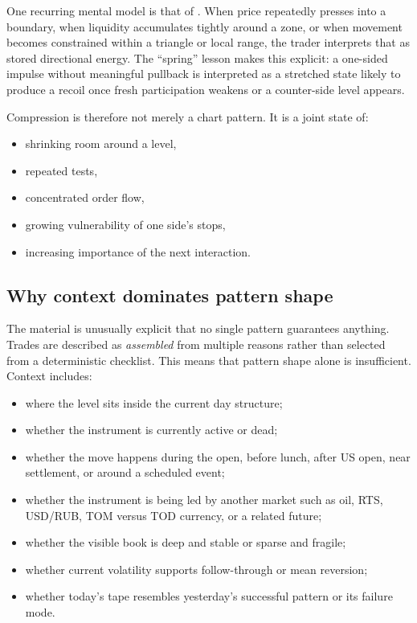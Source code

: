 One recurring mental model is that of . When price repeatedly presses into a boundary, when liquidity accumulates tightly around a zone, or when movement becomes constrained within a triangle or local range, the trader interprets that as stored directional energy. The ``spring'' lesson makes this explicit: a one-sided impulse without meaningful pullback is interpreted as a stretched state likely to produce a recoil once fresh participation weakens or a counter-side level appears.

Compression is therefore not merely a chart pattern. It is a joint state of:

\begin{itemize}[leftmargin=1.5em]
\item shrinking room around a level,
\item repeated tests,
\item concentrated order flow,
\item growing vulnerability of one side's stops,
\item increasing importance of the next interaction.
\end{itemize}

\subsection{Why context dominates pattern shape}

The material is unusually explicit that no single pattern guarantees anything. Trades are described as \emph{assembled} from multiple reasons rather than selected from a deterministic checklist. This means that pattern shape alone is insufficient. Context includes:

\begin{itemize}[leftmargin=1.5em]
\item where the level sits inside the current day structure;
\item whether the instrument is currently active or dead;
\item whether the move happens during the open, before lunch, after US open, near settlement, or around a scheduled event;
\item whether the instrument is being led by another market such as oil, RTS, USD/RUB, TOM versus TOD currency, or a related future;
\item whether the visible book is deep and stable or sparse and fragile;
\item whether current volatility supports follow-through or mean reversion;
\item whether today's tape resembles yesterday's successful pattern or its failure mode.
\end{itemize}

